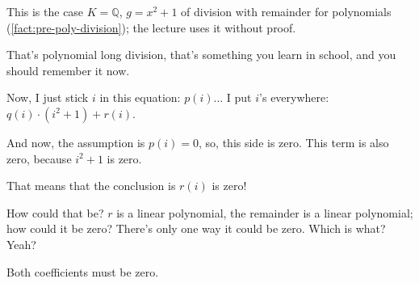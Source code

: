 \begin{content}
This is the case $K = \mathbb{Q}$, $g = x^2 + 1$ of division with remainder for polynomials (\cref{fact:pre-poly-division}); the lecture uses it without proof.
\end{content}

\begin{speech}[01:28:30 - 01:29:15]
That's polynomial long division, that's something you learn in school, and you should remember it now. 

Now, I just stick $i$ in this equation:  $p(i)$... I put $i$'s everywhere: $q(i) \cdot (i^2 + 1) + r(i)$. 

And now, the assumption is $p(i) = 0$, so, this side is zero.  This term is also zero, because $i^2 + 1$ is zero.  

That means that the conclusion is $r(i)$ is zero!  

How could that be? $r$ is a linear polynomial, the remainder is a linear polynomial; how could it be zero? There's only one way it could be zero. Which is what? Yeah?
\end{speech}

\begin{student}
Both coefficients must be zero.
\end{student}


